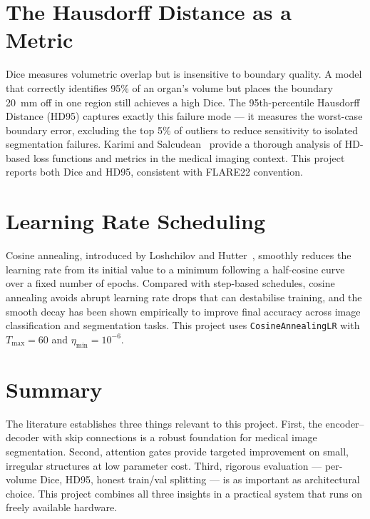 \section{The Hausdorff Distance as a Metric}

Dice measures volumetric overlap but is insensitive to boundary quality. A model that correctly identifies 95\% of an organ's volume but places the boundary 20~mm off in one region still achieves a high Dice. The 95th-percentile Hausdorff Distance (HD95) captures exactly this failure mode --- it measures the worst-case boundary error, excluding the top 5\% of outliers to reduce sensitivity to isolated segmentation failures. Karimi and Salcudean~\cite{karimi2020} provide a thorough analysis of HD-based loss functions and metrics in the medical imaging context. This project reports both Dice and HD95, consistent with FLARE22 convention.

\section{Learning Rate Scheduling}

Cosine annealing, introduced by Loshchilov and Hutter~\cite{loshchilov2017}, smoothly reduces the learning rate from its initial value to a minimum following a half-cosine curve over a fixed number of epochs. Compared with step-based schedules, cosine annealing avoids abrupt learning rate drops that can destabilise training, and the smooth decay has been shown empirically to improve final accuracy across image classification and segmentation tasks. This project uses \texttt{CosineAnnealingLR} with $T_{\max} = 60$ and $\eta_{\min} = 10^{-6}$.

\section{Summary}

The literature establishes three things relevant to this project. First, the encoder--decoder with skip connections is a robust foundation for medical image segmentation. Second, attention gates provide targeted improvement on small, irregular structures at low parameter cost. Third, rigorous evaluation --- per-volume Dice, HD95, honest train/val splitting --- is as important as architectural choice. This project combines all three insights in a practical system that runs on freely available hardware.